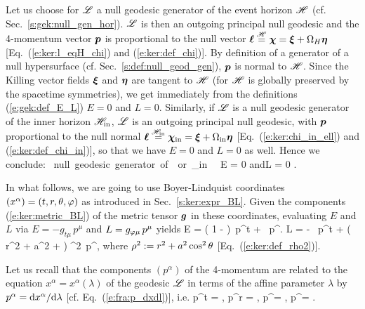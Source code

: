 \begin{example} \label{x:gek:null_generator_hor}
Let us choose for $\mathscr{L}$ a null geodesic generator of the event horizon $\mathscr{H}$
(cf. Sec.~\ref{s:gek:null_gen_hor}). $\mathscr{L}$ is then an outgoing principal null
geodesic and the 4-momentum vector $\bm{p}$ is proportional to the null vector
$\bm{\ell} \stackrel{\mathscr{H}}{=} \bm{\chi} = \bm{\xi} + \Omega_H \bm{\eta}$ [Eq.~(\ref{e:ker:l_eqH_chi})
and (\ref{e:ker:def_chi})].
By definition of a
generator of a null hypersurface (cf. Sec.~\ref{s:def:null_geod_gen}),
$\bm{p}$ is normal to $\mathscr{H}$. Since the Killing vector fields $\bm{\xi}$ and $\bm{\eta}$
are tangent to $\mathscr{H}$ (for $\mathscr{H}$ is globally preserved by the
spacetime symmetries), we get immediately from
the definitions (\ref{e:gek:def_E_L}) $E=0$ and $L=0$.
Similarly, if $\mathscr{L}$ is a null geodesic generator of the
inner horizon $\mathscr{H}_{\rm in}$, $\mathscr{L}$ is an outgoing principal null
geodesic, with $\bm{p}$ proportional to
the null normal
$\bm{\ell} \stackrel{\mathscr{H}_{\rm in}}{=} \bm{\chi}_{\rm in} = \bm{\xi} + \Omega_{\rm in} \bm{\eta}$
[Eq.~(\ref{e:ker:chi_in_ell}) and (\ref{e:ker:def_chi_in})], so that we
have $E=0$ and $L=0$ as well. Hence we conclude:
\be \label{e:gek:generator_hor_E_L_zero}
    \Li \ \mbox{null geodesic generator of}\ \Hor\ \mbox{or}\ \Hor_{\rm in}
   \  \Longrightarrow\  E = 0 \quad\mbox{and}\quad L = 0 .
\ee
\end{example}

In what follows, we are going to use Boyer-Lindquist coordinates
$(x^\alpha)=(t,r,\theta,\varphi)$
as introduced in Sec.~\ref{s:ker:expr_BL}.
Given the components (\ref{e:ker:metric_BL}) of the metric tensor $\bm{g}$
in these coordinates, evaluating $E$ and $L$
via $E = - g_{t\mu} \, p^\mu$ and $L = g_{\varphi\mu} \, p^\mu$ yields
\be \label{e:gek:E_first_int}
    E = \left( 1 -  \right)\,  p^t
        + \,  p^\ph  .
\ee
\be \label{e:gek:L_first_int}
    L = -  \, p^t
        + \left( r^2 + a^2 +  \right)
    \sin^2\th \,  p^\ph ,
\ee
where $\rho^2 := r^2 + a^2 \cos^2\theta$ [Eq.~(\ref{e:ker:def_rho2})].

Let us recall that the components $(p^\alpha)$ of the 4-momentum are
related to the equation $x^\alpha = x^\alpha(\lambda)$ of the geodesic $\mathscr{L}$
in terms of the affine parameter $\lambda$ by $p^\alpha = \mathrm{d} x^\alpha / \mathrm{d}\lambda$
[cf. Eq.~(\ref{e:fra:p_dxdl})], i.e.
\be \label{e:gek:pa_der_xa}
    p^t = ,\quad
    p^r = ,\quad
    p^\th = \derd{\th}{\lambda},\quad
    p^\ph = \derd{\ph}{\lambda} .
\ee

